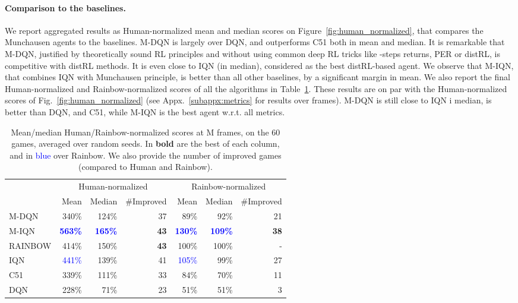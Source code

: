 \documentclass{article}
\begin{document}
\paragraph{Comparison to the baselines.}

We report aggregated results as Human-normalized mean and median scores on Figure~\ref{fig:human_normalized}, that compares the Munchausen agents to the baselines.
M-DQN is largely over DQN, and outperforms C51 both in mean and median. It is remarkable that M-DQN, justified by theoretically sound RL principles and without using common deep RL tricks like -steps returns, PER or distRL, is competitive with distRL methods. It is even close to IQN (in median), considered as the best distRL-based agent. We observe that M-IQN, that combines IQN with Munchausen principle, is better than all other baselines, by a significant margin in mean.
We also report the final Human-normalized and Rainbow-normalized scores of all the algorithms in Table~\ref{tab:score_summary}.
These results are on par with the Human-normalized scores of Fig.~\ref{fig:human_normalized} (see Appx.~\ref{subappx:metrics} for results over frames). M-DQN is still close to IQN i median, is better than DQN, and C51, while M-IQN is the best agent w.r.t. all metrics.

 
 \begin{table}[]
     \centering
     \caption{Mean/median Human/Rainbow-normalized scores at M frames, on the 60 games, averaged over  random seeds. In \textbf{bold} are the best of each column, and in \textcolor{blue}{blue} over Rainbow.
     We also provide the number of improved games (compared to Human and Rainbow).
     }\begin{tabular}{l r r r r r r}
\toprule
& \multicolumn{3}{c}{Human-normalized} & \multicolumn{3}{c}{Rainbow-normalized}\\
\cmidrule(r){2-4} \cmidrule(r){5-7}
         & Mean & Median & \#Improved & Mean & Median & \#Improved\\
\midrule
M-DQN & 340\% & 124\% & 37 & 89\% & 92\%& 21 \\
M-IQN & \textbf{\textcolor{blue}{563\%}} & \textbf{\textcolor{blue}{165\%}} & \textbf{43} &\textbf{\textcolor{blue}{130\%}} & \textbf{\textcolor{blue}{109\%}} & \textbf{38}\\ \hdashline
RAINBOW & 414\% & 150\% & \textbf{43} &100\% &100\% & - \\
IQN & \textcolor{blue}{441\%} & 139\% & 41 &\textcolor{blue}{105\%} & 99\% & 27\\
C51 & 339\% & 111\% & 33 & 84\% & 70\% & 11 \\
DQN & 228\% & 71\% & 23 & 51\%  & 51\% & 3\\
\bottomrule
     \end{tabular}
     \label{tab:score_summary}
 \end{table}
\end{document}
